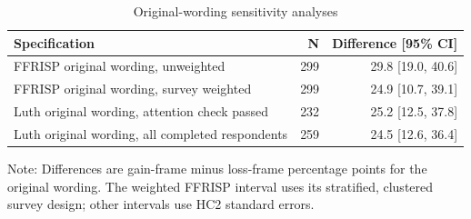 \begin{table}[H]
\centering
\caption{\label{tab:sensitivity}Original-wording sensitivity analyses}
\centering
\begin{threeparttable}
\begin{tabular}[t]{lrr}
\toprule
Specification & N & Difference [95\% CI]\\
\midrule
FFRISP original wording, unweighted & 299 & 29.8 [19.0, 40.6]\\
FFRISP original wording, survey weighted & 299 & 24.9 [10.7, 39.1]\\
Luth original wording, attention check passed & 232 & 25.2 [12.5, 37.8]\\
Luth original wording, all completed respondents & 259 & 24.5 [12.6, 36.4]\\
\bottomrule
\end{tabular}
\begin{tablenotes}[para]
\item Note: Differences are gain-frame minus loss-frame percentage points for the original wording. The weighted FFRISP interval uses its stratified, clustered survey design; other intervals use HC2 standard errors.
\end{tablenotes}
\end{threeparttable}
\end{table}
